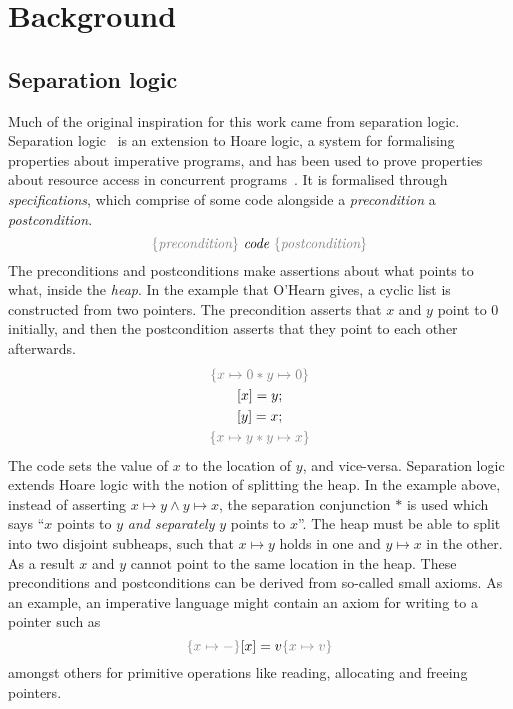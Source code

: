 \chapter{Background}\label{chapter:background}

\section{Separation logic}\label{sec:separationologic}
Much of the original inspiration for this work came from separation
logic. Separation logic~\cite{ohearn2019,reynolds2002} is an
extension to Hoare logic, a system for formalising properties about
imperative programs, and has been used to prove properties about
resource access in concurrent programs~\cite{ohearn2007}. It is
formalised through \emph{specifications}, which comprise of some code
 alongside a \emph{precondition} a \emph{postcondition}.
\[
  {\color{gray} \{\textit{precondition}\}} \
  \textit{code} \
  {\color{gray} \{\textit{postcondition}\}}
\]
The preconditions and postconditions make assertions about what points
to what, inside the \textit{heap}. In the example that
O'Hearn gives, a cyclic list is constructed from two pointers. The
precondition asserts that $x$ and $y$ point to 0 initially, and then
the postcondition asserts that they point to each other afterwards.
\begin{gather*}
  {\color{gray} \{ x \mapsto 0 * y \mapsto 0 \} }\\
  [x] = y; \\
  [y] = x; \\
  {\color{gray} \{ x \mapsto y * y \mapsto x \} }
\end{gather*}
The code sets the value of $x$ to the location of $y$, and
vice-versa. Separation logic extends Hoare logic with the notion of
splitting the heap. In the example above, instead of asserting
$x \mapsto y \wedge y \mapsto x$, the separation conjunction $*$ is used which says
``$x$ points to $y$ \emph{and separately} $y$ points to $x$''. The
heap must be able to split into two disjoint subheaps, such that
$x \mapsto y$ holds in one and $y \mapsto x$ in the other. As a result
$x$ and $y$ cannot point to the same location in the heap.
These preconditions and postconditions can be derived from so-called
small axioms. As an example, an imperative language might contain an axiom
for writing to a pointer such as
\[ {\color{gray} \{x \mapsto -\}} [x] = v {\color{gray} \{x \mapsto v\}} \]
amongst others for primitive operations like reading, allocating and
freeing pointers.


